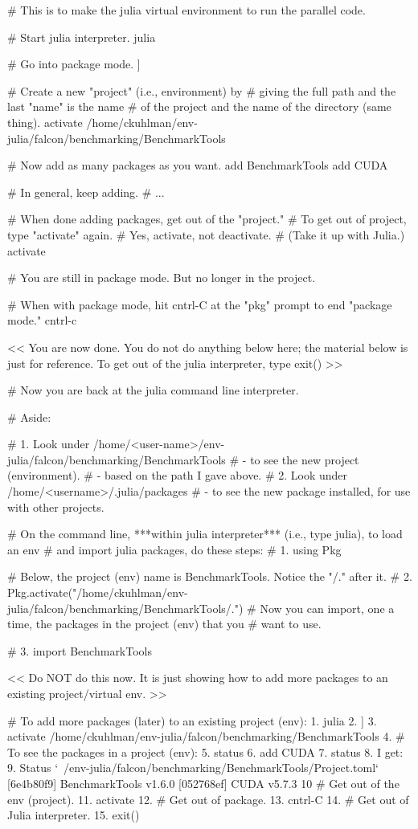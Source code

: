 # This is to make the julia virtual environment to run the parallel code.

# Start julia interpreter.
julia

# Go into package mode.
]

# Create a new "project" (i.e., environment) by
# giving the full path and the last "name" is the name
# of the project and the name of the directory (same thing).
activate /home/ckuhlman/env-julia/falcon/benchmarking/BenchmarkTools

# Now add as many packages as you want.
add BenchmarkTools
add CUDA

# In general, keep adding.
# ...

# When done adding packages, get out of the "project."
# To get out of project, type "activate" again.
# Yes, activate, not deactivate.
# (Take it up with Julia.)
activate

# You are still in package mode. But no longer in the project.

# When with package mode, hit cntrl-C at the "pkg" prompt to end "package mode."
cntrl-c

<< You are now done.  You do not do anything below here; the material below
is just for reference.  To get out of the julia interpreter, type exit() >>


# Now you are back at the julia command line interpreter.

# Aside:

# 1. Look under /home/<user-name>/env-julia/falcon/benchmarking/BenchmarkTools
#     - to see the new project (environment).
#     - based on the path I gave above.
# 2. Look under /home/<username>/.julia/packages 
#     - to see the new package installed, for use with other projects.

# On the command line, ***within julia interpreter*** (i.e., type julia), to load an env
# and import julia packages, do these steps:
# 1. using Pkg

# Below, the project (env) name is BenchmarkTools.  Notice the "/." after it.
# 2. Pkg.activate("/home/ckuhlman/env-julia/falcon/benchmarking/BenchmarkTools/.")
# Now you can import, one a time, the packages in the project (env) that you
# want to use.

# 3. import BenchmarkTools

<< Do NOT do this now.  It is just showing how to add more packages to an existing project/virtual env. >>

# To add more packages (later) to an existing project (env):
1. julia
2. ]
3. activate /home/ckuhlman/env-julia/falcon/benchmarking/BenchmarkTools
4. # To see the packages in a project (env):
5. status
6. add CUDA
7. status
8. I get:
9. Status `~/env-julia/falcon/benchmarking/BenchmarkTools/Project.toml`
  [6e4b80f9] BenchmarkTools v1.6.0
  [052768ef] CUDA v5.7.3
10 # Get out of the env (project).
11. activate
12. # Get out of package.
13. cntrl-C
14. # Get out of Julia interpreter.
15. exit()










